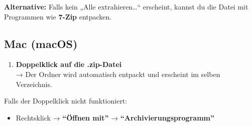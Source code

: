 \documentclass[
  letterpaper,
  DIV=11,
  numbers=noendperiod]{scrreprt}
\providecommand{\tightlist}{%
  \setlength{\itemsep}{0pt}\setlength{\parskip}{0pt}}\usepackage{longtable,booktabs,array}
\begin{document}
\textbf{Alternative:} Falls kein „Alle extrahieren\ldots`` erscheint,
kannst du die Datei mit Programmen wie \textbf{7-Zip} entpacken.

\subsection{\texorpdfstring{\textbf{Mac
(macOS)}}{Mac (macOS)}}\label{mac-macos}

\begin{enumerate}
\def\labelenumi{\arabic{enumi}.}
\tightlist
\item
  \textbf{Doppelklick auf die .zip-Datei}\\
  → Der Ordner wird automatisch entpackt und erscheint im selben
  Verzeichnis.
\end{enumerate}

Falls der Doppelklick nicht funktioniert:

\begin{itemize}
\tightlist
\item
  Rechtsklick → \textbf{``Öffnen mit''} →
  \textbf{``Archivierungsprogramm''}
\end{itemize}
\end{document}
